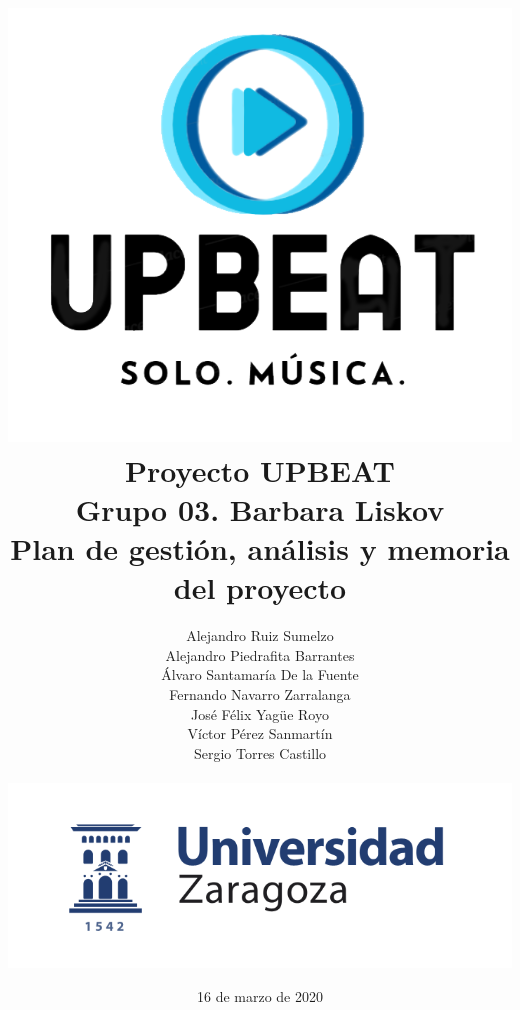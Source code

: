 \documentclass{article}
\begin{document}
\title{\includegraphics[scale=0.65]{logoDefinitivo1.png} \\ \textbf{Proyecto UPBEAT} \\ \textbf{Grupo 03. Barbara Liskov}\\Plan de gestión, análisis y memoria del proyecto \vspace{0.1cm} \\}


\author{Alejandro Ruiz Sumelzo\\
Alejandro Piedrafita Barrantes\\
Álvaro Santamaría De la Fuente\\
Fernando Navarro Zarralanga\\
José Félix Yagüe Royo\\
Víctor Pérez Sanmartín\\
Sergio Torres Castillo \vspace{0.25cm}
\\\\
\includegraphics[scale=0.5]{logoUZ.png}\\
}
\date{16 de marzo de 2020}
\end{document}
